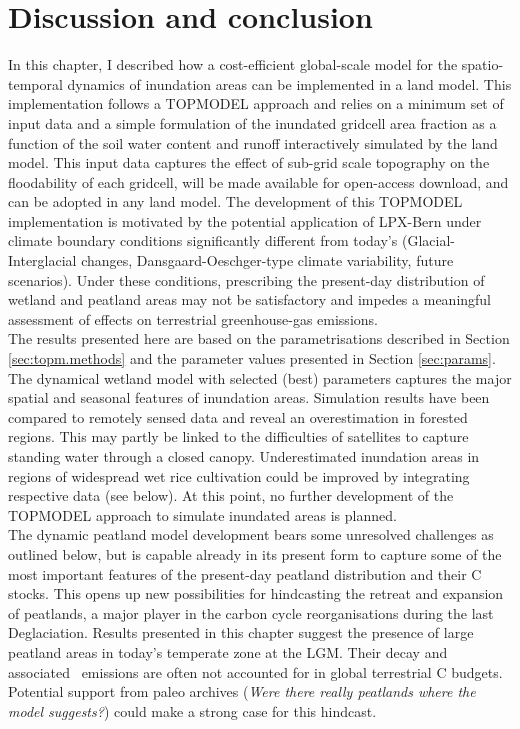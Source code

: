 
\section{Discussion and conclusion} 
\label{sec:discussion}
In this chapter, I described how a cost-efficient global-scale model for the spatio-temporal dynamics of inundation areas can be implemented in a land model. This implementation follows a TOPMODEL approach and relies on a minimum set of input data and a simple formulation of the inundated gridcell area fraction as a function of the soil water content and runoff interactively simulated by the land model. This input data captures the effect of sub-grid scale topography on the floodability of each gridcell, will be made available for open-access download, and can be adopted in any land model. The development of this TOPMODEL implementation is motivated by the potential application of LPX-Bern under climate boundary conditions significantly different from today's (Glacial-Interglacial changes, Dansgaard-Oeschger-type climate variability, future scenarios). Under these conditions, prescribing the present-day distribution of wetland and peatland areas may not be satisfactory and impedes a meaningful assessment of effects on terrestrial greenhouse-gas emissions.\\

The results presented here are based on the parametrisations described in Section \ref{sec:topm.methods} and the parameter values presented in Section \ref{sec:params}. The dynamical wetland model with selected (best) parameters captures the major spatial and seasonal features of inundation areas. Simulation results have been compared to remotely sensed data \citep{prigent07grl} and reveal an overestimation in forested regions. This may partly be linked to the difficulties of satellites to capture standing water through a closed canopy. Underestimated inundation areas in regions of widespread wet rice cultivation could be improved by integrating respective data (see below). At this point, no further development of the TOPMODEL approach to simulate inundated areas is planned.\\

The dynamic peatland model development bears some unresolved challenges as outlined below, but is capable already in its present form to capture some of the most important features of the present-day peatland distribution and their C stocks. This opens up new possibilities for hindcasting the retreat and expansion of peatlands, a major player in the carbon cycle reorganisations during the last Deglaciation. Results presented in this chapter suggest the presence of large peatland areas in today's temperate zone at the LGM. Their decay and associated \coo\ emissions are often not accounted for in global terrestrial C budgets. Potential support from paleo archives ({\it Were there really peatlands where the model suggests?}) could make a strong case for this hindcast.\\ 


